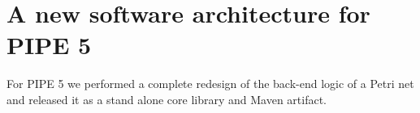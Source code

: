 \section{A new software architecture for PIPE 5}
For PIPE 5 we performed a complete redesign of the back-end logic of a Petri net and released it as a stand alone core library and Maven artifact. 





